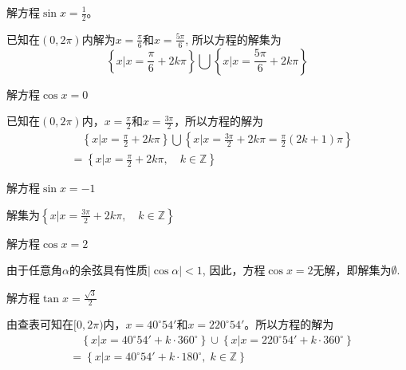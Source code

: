 \begin{example}
    解方程$\sin x=\frac{1}{2}$。
\end{example}

\begin{solution}
    已知在$(0, 2\pi)$内解为$x=\frac{\pi}{6}$和$x=\frac{5\pi}{6}$,
所以方程的解集为
\[\left\{x\Big|x=\frac{\pi}{6}+2k\pi\right\} \bigcup \left\{x\Big|x=\frac{5\pi}{6}+2k\pi\right\}\]
\end{solution}


\begin{example}
    解方程$\cos x=0$
\end{example}

\begin{solution}
    已知在$(0, 2\pi)$内，$x=\frac{\pi}{2}$和$x=\frac{3\pi}{2}$，所以方程的解为
    \[\begin{split}
 &\quad        \left\{x\Big|x=\frac{\pi}{2}+2k\pi\right\} \bigcup \left\{x\Big|x=\frac{3\pi}{2}+2k\pi=\frac{\pi}{2}(2k+1)\pi\right\}\\
        &=\left\{x\Big|x=\frac{\pi}{2}+2k\pi,\quad k\in\mathbb{Z}\right\} 
    \end{split} \]
\end{solution}


\begin{example}
    解方程$\sin x=-1$
\end{example}

\begin{solution}
    解集为$\left\{x\Big|x=\frac{3\pi}{2}+2k\pi,\quad k\in\mathbb{Z}\right\}$
\end{solution}

\begin{example}
    解方程$\cos x=2$
\end{example}

\begin{solution}
    由于任意角$\alpha$的余弦具有性质$|\cos\alpha|<1$, 因此，方程$\cos x=2$无解，即解集为$\emptyset$.
\end{solution}

\begin{example}
    解方程$\tan x=\frac{\sqrt{3}}{2}$
\end{example}

\begin{solution}
    由查表可知在$[0, 2\pi)$内，$x=40^{\circ}54'$和$x=220^{\circ}54'$。所以方程的解为
\[\begin{split}
   & \quad \left\{x\Big|x=40^{\circ}54'+k\cdot 360^{\circ}\right\} \cup \left\{x\Big|x=220^{\circ}54'+k\cdot 360^{\circ}\right\}\\
   &=\left\{x\Big|x=40^{\circ}54'+k\cdot 180^{\circ},\; k\in\mathbb{Z}\right\}
\end{split}\]
\end{solution}

